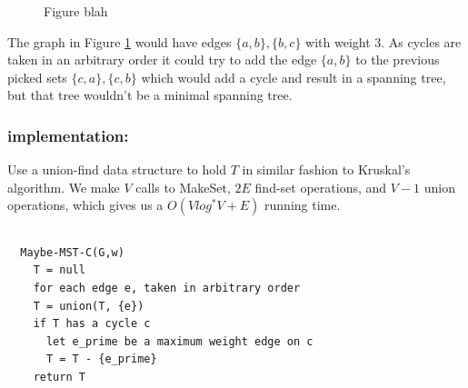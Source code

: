 \documentclass[titlepage]{article}
\theoremstyle{definition}
\begin{document}
    \usetikzlibrary{arrows}
    \begin{figure}
      \begin{center}
      \end{center}
    \caption{Figure blah}
    \label{fig:mst}
    \end{figure}

    The graph in Figure \ref{fig:mst} would have edges $\{a,b\}, \{b,c\}$ with
    weight 3. As cycles are taken in an arbitrary order it could try to add the
    edge $\{a,b\}$  to the previous picked sets $\{c,a\}, \{c,b\}$ which would add
    a cycle and result in a spanning tree, but that tree wouldn't be a minimal
    spanning tree. 

    \subsubsection{implementation:}
      Use a union-find data structure to hold $T$ in similar fashion to Kruskal's
      algorithm. We make $V$ calls to MakeSet, $2E$ find-set operations, and
      $V-1$ union operations, which gives us a $O(V log^* V + E)$ running time. 


\subsection{}
  \begin{lstlisting}
  Maybe-MST-C(G,w)
    T = null
    for each edge e, taken in arbitrary order
    T = union(T, {e})
    if T has a cycle c
      let e_prime be a maximum weight edge on c
      T = T - {e_prime}
    return T
  \end{lstlisting}
\end{document}
